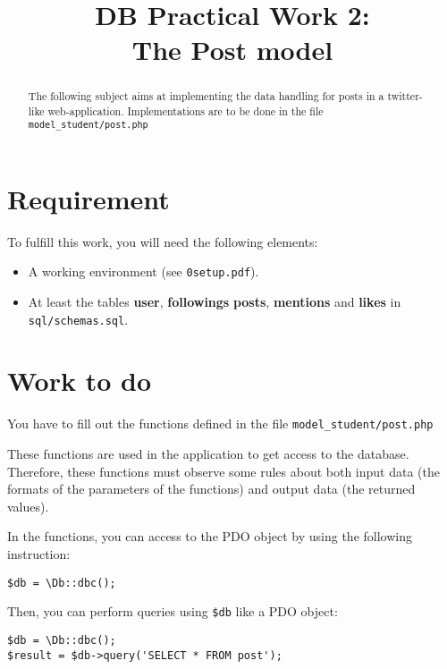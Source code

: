 \documentclass[twoside,a4paper,12pt]{article}
\title{DB Practical Work 2:\\The Post model}
\date{}
\begin{document}
\maketitle

\begin{abstract}
  The following subject aims at implementing the data handling for posts in a twitter-like web-application. Implementations are to be done in the file \texttt{model\_student/post.php}
\end{abstract}

\tableofcontents

\clearpage

\section{Requirement}
To fulfill this work, you will need the following elements:

\begin{itemize}
\item A working environment (see \texttt{0setup.pdf}).
\item At least the tables \textbf{user}, \textbf{followings} \textbf{posts}, \textbf{mentions} and \textbf{likes} in \texttt{sql/schemas.sql}.
\end{itemize}

\section{Work to do}
You have to fill out the functions defined in the file \texttt{model\_student/post.php}

These functions are used in the application to get access to the database. Therefore, these functions must observe some rules about both input data (the formats of the parameters of the functions) and output data (the returned values).

In the functions, you can access to the PDO object by using the following instruction:

\begin{lstlisting}
$db = \Db::dbc();
\end{lstlisting}

Then, you can perform queries using \texttt{\$db} like a PDO object:
\begin{lstlisting}
$db = \Db::dbc();
$result = $db->query('SELECT * FROM post');
\end{lstlisting}
\end{document}
